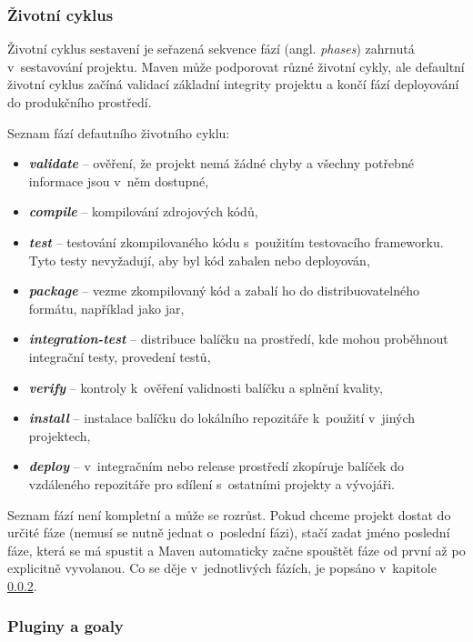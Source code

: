 \documentclass[11pt,twoside,a4paper]{book}
\begin{document}
\subsubsection{Životní cyklus}

Životní cyklus sestavení je seřazená sekvence fází (angl. {\em phases}) zahrnutá
v~sestavování projektu. Maven může podporovat různé životní cykly, ale defaultní
životní cyklus začíná validací základní integrity projektu a končí fází deployování do produkčního prostředí.

Seznam fází defautního životního cyklu:

\begin{itemize}
  \item \textbf{\textit{validate}} – ověření, že projekt nemá žádné
  chyby a všechny potřebné informace jsou v~něm dostupné,
  \item \textbf{\textit{compile}} – kompilování zdrojových kódů,
  \item \textbf{\textit{test}} – testování zkompilovaného kódu s~použitím
  testovacího frameworku. Tyto testy nevyžadují, aby byl kód zabalen nebo deployován,
  \item \textbf{\textit{package}} – vezme zkompilovaný kód a zabalí ho do
  distribuovatelného formátu, například jako jar,
\item \textbf{\textit{integration-test}} – distribuce balíčku na
prostředí, kde mohou proběhnout integrační testy, provedení testů,
\item \textbf{\textit{verify}} – kontroly k~ověření validnosti balíčku a
splnění kvality,
\item \textbf{\textit{install}} – instalace balíčku do lokálního repozitáře
k~použití v~jiných projektech,
\item \textbf{\textit{deploy}} – v~integračním nebo release prostředí
zkopíruje balíček do vzdáleného repozitáře pro sdílení s~ostatními projekty a
vývojáři.
\end{itemize}

Seznam fází není kompletní a může se rozrůst. Pokud chceme projekt dostat do určité fáze
(nemusí se nutně jednat o~poslední fázi), stačí zadat jméno poslední fáze, která se má spustit a
Maven automaticky začne spouštět fáze od první až po explicitně vyvolanou. Co se děje
v~jednotlivých fázích, je popsáno v~kapitole \ref{subsec:pluginy-a-goaly}.

\subsubsection{Pluginy a goaly}
\label{subsec:pluginy-a-goaly}
\end{document}
